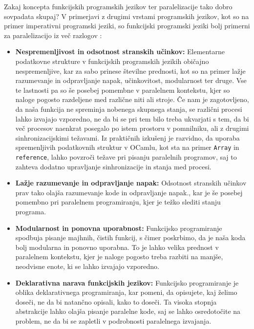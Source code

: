 \documentclass[mat1, tisk]{fmfdelo}
\begin{document}
Zakaj koncepta funkcijskih programskih jezikov ter paralelizacije tako dobro sovpadata skupaj?
V primerjavi z drugimi vrstami programskih jezikov, kot so na primer imperativni programski jeziki,
so funkcijski programski jeziki bolj primerni za paralelizacijo iz več razlogov 
\cite{parallelisation_advantages_stack_discussion_2023, functional_parallel_graph_rewriting}:

\begin{itemize} \label{itemize:prednosti_funkcijskega_programiranja}
  \item \textbf{Nespremenljivost in odsotnost stranskih učinkov:} 
    Elementarne podatkovne strukture v funkcijskih programskih jezikih običajno nespremenljive, kar za sabo prinese številne
    prednosti, kot so na primer lažje razumevanje in odpravljanje napak, učinkovitost, modularnost 
    ter druge. Vse te lastnosti pa so še posebej pomembne v paralelnem kontekstu, kjer so naloge pogosto razdeljene med
    različne niti ali stroje. Če nam je zagotovljeno, da naša funkcija ne spreminja nobenega skupnega stanja, se
    različni procesi lahko izvajajo vzporedno, ne da bi se pri tem bilo treba ukvarjati s tem, da bi več procesov
    naenkrat posegalo po istem prostoru v pomnilniku, ali z drugimi sinhronizacijskimi težavami.
    Iz praktičnih izkušenj je razvidno, da uporaba spremenljivih podatkovnih struktur v OCamlu, kot sta na primer
    \texttt{Array} in \texttt{reference}, lahko povzroči težave pri pisanju paralelnih programov, saj to zahteva
    dodatno upravljanje sinhronizacije in stanja med procesi.

  \item \textbf{Lažje razumevanje in odpravljanje napak:} 
    Odsotnost stranskih učinkov prav tako olajša razumevanje kode in odpravljanje napak., kar je še posebej
    pomembno pri paralelnem programiranju, kjer je težko slediti stanju programa.

  \item \textbf{Modularnost in ponovna uporabnost:}
    Funkcijsko programiranje spodbuja pisanje majhnih, čistih funkcij, s čimer poskrbimo, da je naša koda bolj 
    modularna in ponovno uporabna. To je lahko velika prednost v paralelnem kontekstu,
    kjer je naloge pogosto treba razbiti na manjše, neodvisne enote, ki se lahko izvajajo vzporedno.

  \item \textbf{Deklarativna narava funkcijskih jezikov:} 
    Funkcijsko programiranje je oblika deklarativnega programiranja, kar pomeni, da opisujete, kaj želimo doseči, 
    ne da bi natančno opisali, kako to doseči. Ta visoka stopnja abstrakcije lahko olajša pisanje paralelne kode, 
    saj se lahko osredotočite na problem, ne da bi se zapletli v podrobnosti paralelnega izvajanja.
\end{itemize}
\end{document}
